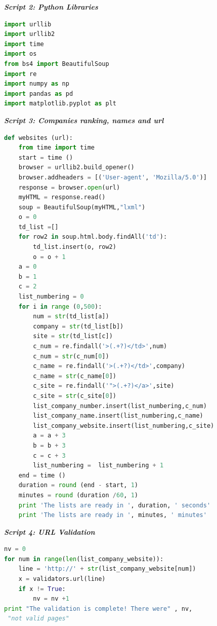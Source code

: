 \documentclass{article}
\begin{document}
\begin{center}
\textit{\textbf{Script 2: Python Libraries}}\label{p2}
\end{center}
\begin{lstlisting}[language=Python]
import urllib
import urllib2
import time
import os
from bs4 import BeautifulSoup
import re
import numpy as np
import pandas as pd
import matplotlib.pyplot as plt
\end{lstlisting}

\begin{center}
\textit{\textbf{Script 3: Companies ranking, names and url}}\label{p3}
\end{center}
\begin{lstlisting}[language=Python]
def websites (url): 
    from time import time
    start = time ()
    browser = urllib2.build_opener() 
    browser.addheaders = [('User-agent', 'Mozilla/5.0')]
    response = browser.open(url)
    myHTML = response.read()
    soup = BeautifulSoup(myHTML,"lxml")    
    o = 0
    td_list =[]
    for row2 in soup.html.body.findAll('td'):
        td_list.insert(o, row2)
        o = o + 1
    a = 0
    b = 1
    c = 2
    list_numbering = 0
    for i in range (0,500):        
        num = str(td_list[a])
        company = str(td_list[b])
        site = str(td_list[c])
        c_num = re.findall('>(.+?)</td>',num)  
        c_num = str(c_num[0])
        c_name = re.findall('>(.+?)</td>',company)
        c_name = str(c_name[0])
        c_site = re.findall('">(.+?)</a>',site)
        c_site = str(c_site[0])        
        list_company_number.insert(list_numbering,c_num)
        list_company_name.insert(list_numbering,c_name)
        list_company_website.insert(list_numbering,c_site)
        a = a + 3
        b = b + 3
        c = c + 3
        list_numbering =  list_numbering + 1 
    end = time ()
    duration = round (end - start, 1)
    minutes = round (duration /60, 1)
    print 'The lists are ready in ', duration, ' seconds'
    print 'The lists are ready in ', minutes, ' minutes'
\end{lstlisting}

\begin{center}
\textit{\textbf{Script 4: URL Validation}}\label{p4}
\end{center}
\begin{lstlisting}[language=Python]
nv = 0
for num in range(len(list_company_website)):
    line = 'http://' + str(list_company_website[num])
    x = validators.url(line)    
    if x != True:
        nv = nv +1
print "The validation is complete! There were" , nv,
 "not valid pages"
\end{lstlisting}
\end{document}
